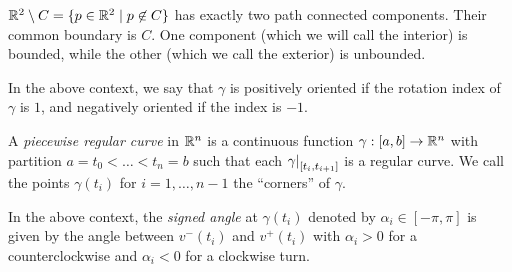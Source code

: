 \begin{simplethm}
    $\mathbb R^2 \setminus C = \{p \in \mathbb R^2 \mid p \not\in C\}$ has exactly two path connected components. Their common boundary is $C$. One component (which we will call the interior) is bounded, while the other (which we call the exterior) is unbounded. 
\end{simplethm}
\begin{definition}
    In the above context, we say that $\gamma$ is positively oriented if the rotation index of $\gamma$ is $1$, and negatively oriented if the index is $-1$.
\end{definition}
\begin{definition}
    A \textit{piecewise regular curve} in $\mathbb R^n$ is a continuous function $\gamma : [a, b] \to \mathbb R^n$ with partition $a = t_0 < \dots < t_n = b$ such that each $\restr{\gamma}{[t_i, t_{i+1}]}$ is a regular curve. We call the points $\gamma(t_i)$ for $i = 1, \dots, n-1$ the ``corners'' of $\gamma$.
\end{definition}
\begin{definition}
    In the above context, the \textit{signed angle} at $\gamma(t_i)$ denoted by $\alpha_i \in [-\pi, \pi]$ is given by the angle between $v^-(t_i)$ and $v^+(t_i)$ with $\alpha_i > 0$ for a counterclockwise and $\alpha_i < 0$ for a clockwise turn.
\end{definition}

